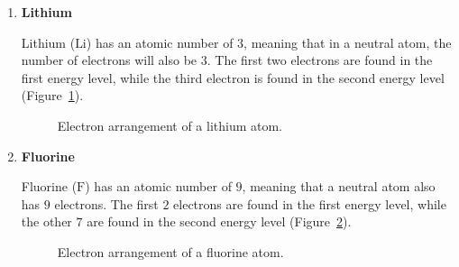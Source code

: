 \begin{enumerate}[noitemsep, label=\textbf{\arabic*}. ] 

\item{\textbf{Lithium} \\
\begin{minipage}{.4\textwidth}
Lithium ($\text{Li}$) has an atomic number of $3$, meaning that in a neutral atom, the number of electrons will also be $3$. The first two electrons are found in the first energy level, while the third electron is found in the second energy level (Figure~\ref{fig:atom:lithium}).
\end{minipage}
\begin{minipage}{.6\textwidth}
\begin{figure}[H]
\begin{center}
\caption{Electron arrangement of a lithium atom.}
\label{fig:atom:lithium}
\end{center}
\end{figure}
\end{minipage}
}
\pagebreak
\item{\textbf{Fluorine} \\
\begin{minipage}{.4\textwidth}
Fluorine ($\text{F}$) has an atomic number of $9$, meaning that a neutral atom also has $9$ electrons. The first $2$ electrons are found in the first energy level, while the other $7$ are found in the second energy level (Figure~\ref{fig:atom:fluorine}).
\end{minipage}
\begin{minipage}{.6\textwidth}
\begin{figure}[H]
\begin{center}
\caption{Electron arrangement of a fluorine atom.}
\label{fig:atom:fluorine}
\end{center}
\end{figure}
\end{minipage}
}


\end{enumerate}
